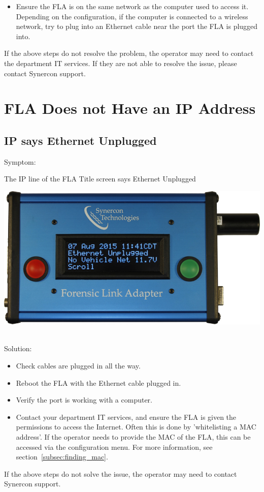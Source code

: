 \documentclass[11pt, oneside]{book}
\begin{document}
\begin{itemize}
\item Ensure the FLA is on the same network as the computer used to access it. Depending on the configuration, if the computer is connected to a wireless network, try to plug into an Ethernet cable near the port the FLA is plugged into.
\end{itemize}
If the above steps do not resolve the problem, the operator may need to contact the department IT services. If they are not able to resolve the issue, please contact Synercon support.

\section{FLA Does not Have an IP Address}
\subsection{IP says Ethernet Unplugged}
Symptom:\\
\noindent\begin{minipage}{0.45\textwidth}%
The IP line of the FLA Title screen says Ethernet Unplugged
\end{minipage}%
\hfill%
\begin{minipage}{0.45\textwidth}
\includegraphics[width=\linewidth]{../media/fla_screens/no_ethernet/title_no_net}
\end{minipage}\\
Solution:\\
\begin{itemize}
\item Check cables are plugged in all the way.
\item Reboot the FLA with the Ethernet cable plugged in.
\item Verify the port is working with a computer.
\item Contact your department IT services, and ensure the FLA is given the permissions to access the Internet. Often this is done by 'whitelisting a MAC address'. If the operator needs to provide the MAC of the FLA, this can be accessed via the configuration menu. For more information, see section~\ref{subsec:finding_mac}.
\end{itemize}
If the above steps do not solve the issue, the operator may need to contact Synercon support.
\end{document}
